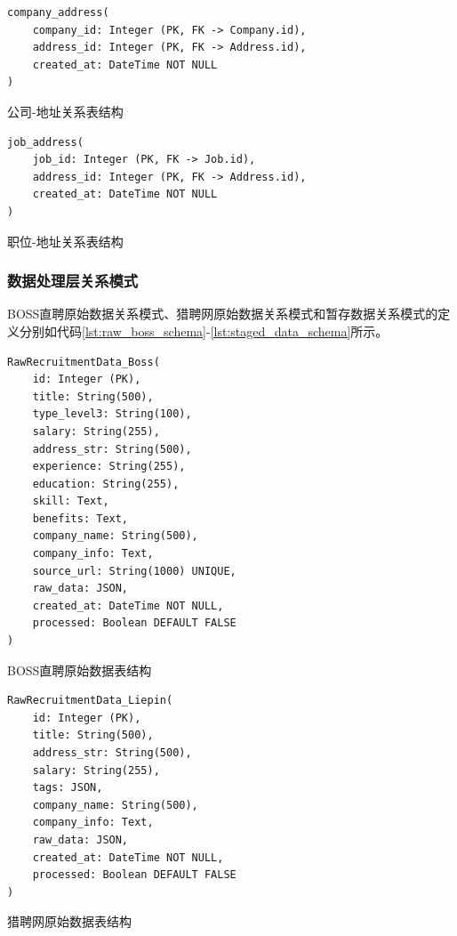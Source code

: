   \begin{listing}[htbp]
    \begin{verbatim}
company_address(
    company_id: Integer (PK, FK -> Company.id),
    address_id: Integer (PK, FK -> Address.id),
    created_at: DateTime NOT NULL
)
    \end{verbatim}
    \caption{公司-地址关系表结构}\label{lst:company_address_schema}
  \end{listing}

  \begin{listing}[htbp]
    \begin{verbatim}
job_address(
    job_id: Integer (PK, FK -> Job.id),
    address_id: Integer (PK, FK -> Address.id),
    created_at: DateTime NOT NULL
)
    \end{verbatim}
    \caption{职位-地址关系表结构}\label{lst:job_address_schema}
  \end{listing}

\subsubsection{数据处理层关系模式}

BOSS直聘原始数据关系模式、猎聘网原始数据关系模式和暂存数据关系模式的定义分别如代码\ref{lst:raw_boss_schema}-\ref{lst:staged_data_schema}所示。

  \begin{listing}[htbp]
    \begin{verbatim}
RawRecruitmentData_Boss(
    id: Integer (PK),
    title: String(500),
    type_level3: String(100),
    salary: String(255),
    address_str: String(500),
    experience: String(255),
    education: String(255),
    skill: Text,
    benefits: Text,
    company_name: String(500),
    company_info: Text,
    source_url: String(1000) UNIQUE,
    raw_data: JSON,
    created_at: DateTime NOT NULL,
    processed: Boolean DEFAULT FALSE
)
    \end{verbatim}
    \caption{BOSS直聘原始数据表结构}\label{lst:raw_boss_schema}
  \end{listing}

  \begin{listing}[htbp]
    \begin{verbatim}
RawRecruitmentData_Liepin(
    id: Integer (PK),
    title: String(500),
    address_str: String(500),
    salary: String(255),
    tags: JSON,
    company_name: String(500),
    company_info: Text,
    raw_data: JSON,
    created_at: DateTime NOT NULL,
    processed: Boolean DEFAULT FALSE
)
    \end{verbatim}
    \caption{猎聘网原始数据表结构}\label{lst:raw_liepin_schema}
  \end{listing}

